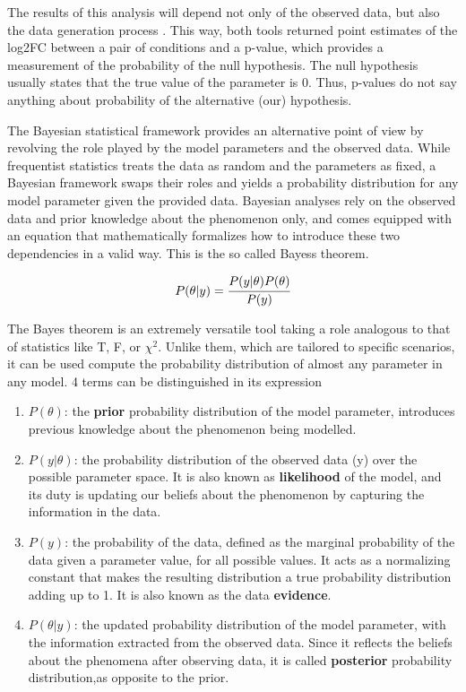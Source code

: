 The results of this analysis will depend not only of the observed data, but also the data generation process \cite{Kruschke}. This way, both tools returned point estimates of the log2FC between a pair of conditions and a p-value, which provides a measurement of the probability of the null hypothesis. The null hypothesis usually states that the true value of the parameter is 0. Thus, p-values do not say anything about probability of the alternative (our) hypothesis.

The Bayesian statistical framework provides an alternative point of view by revolving the role played by the model parameters and the observed data. While frequentist statistics treats the data as random and the parameters as fixed, a Bayesian framework swaps their roles and yields a probability distribution for any model parameter given the provided data. Bayesian analyses rely on the observed data and prior knowledge about the phenomenon only, and comes equipped with an equation that mathematically formalizes how to introduce these two dependencies in a valid way. This is the so called Bayes\textquotesingle s theorem.

\begin{equation}
P(\theta | y) = \cfrac{P(y | \theta) P(\theta)}{P(y)}
\end{equation}

The Bayes theorem is an extremely versatile tool taking a role analogous to that of statistics like T, F, or $\chi^2$. Unlike them, which are tailored to specific scenarios, it can be used compute the probability distribution of almost any parameter in any model. 4 terms can be distinguished in its expression

\begin{enumerate}

\item $P(\theta)$: the \textbf{prior} probability distribution of the model parameter, introduces previous knowledge about the phenomenon being modelled.

\item $P(y | \theta)$: the probability distribution of the observed data (y) over the possible parameter space. It is also known as \textbf{likelihood} of the model, and its duty is updating our beliefs about the phenomenon by capturing the information in the data.

\item $P(y)$: the probability of the data, defined as the marginal probability of the data given a parameter value, for all possible values. It acts as a normalizing constant that makes the resulting distribution a true probability distribution adding up to 1. It is also known as the data \textbf{evidence}.

\item $P(\theta | y)$: the updated probability distribution of the model parameter, with the information extracted from the observed data. Since it reflects the beliefs about the phenomena after observing data, it is called \textbf{posterior} probability distribution,as opposite to the prior.

\end{enumerate}


